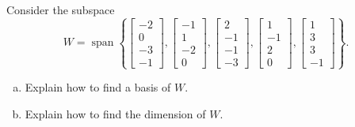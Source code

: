 
\begin{exerciseStatement}


Consider the subspace \[W=\operatorname{span}  \left\{ \left[\begin{array}{c}
-2 \\
0 \\
-3 \\
-1
\end{array}\right] , \left[\begin{array}{c}
-1 \\
1 \\
-2 \\
0
\end{array}\right] , \left[\begin{array}{c}
2 \\
-1 \\
-1 \\
-3
\end{array}\right] , \left[\begin{array}{c}
1 \\
-1 \\
2 \\
0
\end{array}\right] , \left[\begin{array}{c}
1 \\
3 \\
3 \\
-1
\end{array}\right] \right\} .\]


\begin{enumerate}[(a)]
\item  Explain how to find a basis of \(W\).
\item  Explain how to find the dimension of \(W\).
\end{enumerate}
    
\end{exerciseStatement}
    
